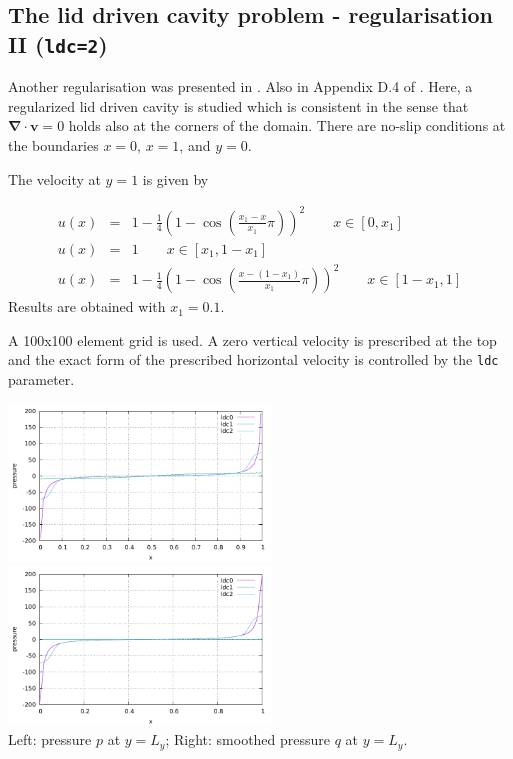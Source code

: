 \subsection*{The lid driven cavity problem - regularisation II ({\tt ldc=2})}

Another regularisation was presented in \cite{dejn16}. Also in Appendix D.4 of \cite{john16}. 
Here, a regularized lid driven cavity is studied which is consistent in the sense that 
${\bm \nabla}\cdot{\bm v}=0$ 
holds also at the corners of the domain.
There are no-slip conditions at the boundaries $x=0$, $x=1$, and $y=0$. 

The velocity at $y=1$ is given by

\begin{eqnarray}
u(x) &=& 1-\frac{1}{4}\left( 1-\cos (\frac{x_1-x}{x_1}\pi)  \right)^2   \quad\quad x\in[0,x_1] \nonumber\\
u(x) &=& 1 \quad\quad x\in[x_1,1-x_1] \nonumber\\
u(x) &=& 1-\frac{1}{4}\left( 1-\cos (\frac{x-(1-x_1)}{x_1}\pi)  \right)^2   \quad\quad x\in[1-x_1,1]
\end{eqnarray}
Results are obtained with $x_1=0.1$.

\newpage
A 100x100 element grid is used. 
A zero vertical velocity is prescribed at the top and the exact form of the 
prescribed horizontal velocity is controlled by the {\tt ldc} parameter.

\begin{center}
\includegraphics[width=7cm]{python_codes/fieldstone_04/results/p.pdf}
\includegraphics[width=7cm]{python_codes/fieldstone_04/results/q.pdf}\\
{\captionfont Left: pressure $p$ at $y=L_y$; Right: smoothed pressure $q$ at $y=L_y$.}
\end{center}

